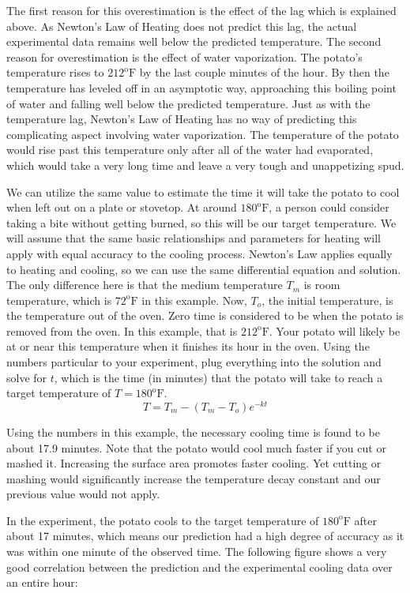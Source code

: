 \documentclass{ximera}
\begin{document}
The first reason for this overestimation is the effect of the lag which is explained above.  As Newton's Law of Heating does not predict this lag, the actual experimental data remains well below the predicted temperature.  The second reason for overestimation is the effect of water vaporization.  The potato's temperature rises to $212^{\text{o}}\text{F}$ by the last couple minutes of the hour.  By then the temperature has leveled off in an asymptotic way, approaching this boiling point of water and falling well below the predicted temperature.  Just as with the temperature lag, Newton's Law of Heating has no way of predicting this complicating aspect involving water vaporization.  The temperature of the potato would rise past this temperature only after all of the water had evaporated, which would take a very long time and leave a very tough and unappetizing spud.
 
We can utilize the same  value to estimate the time it will take the potato to cool when left out on a plate or stovetop.  At around $180^{\text{o}}\text{F}$, a person could consider taking a bite without getting burned, so this will be our target temperature.  We will assume that the same basic relationships and parameters for heating will apply with equal accuracy to the cooling process.  Newton's Law applies equally to heating and cooling, so we can use the same differential equation and solution.  The only difference here is that the medium temperature  $T_m$ is room temperature, which is $72^{\text{o}}\text{F}$  in this example.  Now, $T_o$, the initial temperature, is the temperature out of the oven.  Zero time is considered to be when the potato is removed from the oven.  In this example, that is $212^{\text{o}}\text{F}$.  Your potato will likely be at or near this temperature when it finishes its hour in the oven.  Using the numbers particular to your experiment, plug everything into the solution and solve for $t$, which is the time (in minutes) that the potato will take to reach a target temperature of $T=180^{\text{o}}\text{F}$.
\[
T=T_m-(T_m-T_o ) e^{-kt}
\]
 
Using the numbers in this example, the necessary cooling time is found to be about 17.9 minutes.  Note that the potato would cool much faster if you cut or mashed it.  Increasing the surface area promotes faster cooling.  Yet cutting or mashing would significantly increase the temperature decay constant and our previous value would not apply.
 
In the experiment, the potato cools to the target temperature of $180^{\text{o}}\text{F}$ after about 17 minutes, which means our prediction had a high degree of accuracy as it was within one minute of the observed time. The following figure shows a very good correlation between the prediction and the experimental cooling data over an entire hour:
  
\end{document}
